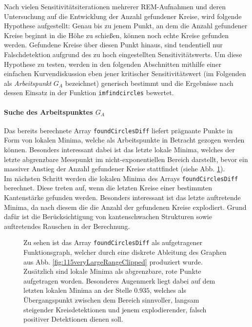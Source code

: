 \documentclass[accentcolor=tud1c, 11pt, toc=bib, toc=listof, captions=abovetable, parskip=half]{tudreport}
\begin{document}


Nach vielen Sensitivitätsiterationen mehrerer REM-Aufnahmen und deren Untersuchung auf die Entwicklung der Anzahl gefundener Kreise, wird folgende Hypothese aufgestellt: Genau bis zu jenem Punkt, an dem die Anzahl gefundener Kreise beginnt in die Höhe zu schießen, können noch echte Kreise gefunden werden. Gefundene Kreise über diesen Punkt hinaus, sind tendentiell nur Falschdetektion aufgrund des zu hoch eingestellten Sensitivitätswerts. Um diese Hypothese zu testen, werden in den folgenden Abschnitten mithilfe einer einfachen Kurvendiskussion eben jener kritischer Sensitivitätswert (im Folgenden als \textit{Arbeitspunkt} $G_A$ bezeichnet) generisch bestimmt und die Ergebnisse nach dessen Einsatz in der Funktion \lstinline|imfindcircles| bewertet.

\paragraph{Suche des Arbeitspunktes $G_A$}
Das bereits berechnete Array \lstinline|foundCirclesDiff| liefert prägnante Punkte in Form von lokalen Minima, welche als Arbeitspunkte in Betracht gezogen werden können. Besonders interessant dabei ist das letzte lokale Minima, welches der letzte abgrenzbare Messpunkt im nicht-exponentiellen Bereich darstellt, bevor ein massiver Anstieg der Anzahl gefundener Kreise stattfindet (siehe Abb. \ref{fig:115sensitivity}).\\

Im nächsten Schritt werden die lokalen Minima des Arrays \lstinline|foundCirclesDiff| berechnet. Diese treten auf, wenn die letzten Kreise einer bestimmten Kantenstärke gefunden werden. Besonders interessant ist das letzte auftretende Minima, da nach diesem die die Anzahl der gefundenen Kreise explodiert. Grund dafür ist die Berücksichtigung von kantenschwachen Strukturen sowie auftretendes Rauschen in der Berechnung.\\

\begin{figure}
\centering

\caption{Zu sehen ist das Array \lstinline|foundCirclesDiff| als aufgetragener Funktionsgraph, welcher durch eine diskrete Ableitung des Graphen aus Abb. \ref{fig:115veryLargeRangeClipped} produziert wurde. Zusätzlich sind lokale Minima als abgrenzbare, rote Punkte aufgetragen worden. Besonderes Augenmerk liegt dabei auf dem letzten lokalen Minima an der Stelle $0.935$, welches als Übergangspunkt zwischen dem Bereich sinnvoller, langsam steigender Kreisdetektionen und jenem explodierender, falsch positiver Detektionen dienen soll.}
\label{fig:115sensitivity}
\end{figure}
\end{document}
